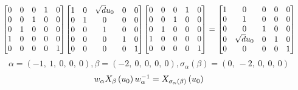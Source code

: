 \documentclass[11pt]{article}
\theoremstyle{definition}
\begin{document}
\[
\scaletoalign{\textwidth}{{\left[\begin{matrix}0 & 0 & 0 & 1 & 0\\0 & 0 & 1 & 0 & 0\\0 & 1 & 0 & 0 & 0\\1 & 0 & 0 & 0 & 0\\0 & 0 & 0 & 0 & 1\end{matrix}\right]} {\left[\begin{matrix}1 & 0 & \sqrt{d} u_{0} & 0 & 0\\0 & 1 & 0 & 0 & 0\\0 & 0 & 1 & 0 & 0\\0 & 0 & 0 & 1 & 0\\0 & 0 & 0 & 0 & 1\end{matrix}\right]} {\left[\begin{matrix}0 & 0 & 0 & 1 & 0\\0 & 0 & 1 & 0 & 0\\0 & 1 & 0 & 0 & 0\\1 & 0 & 0 & 0 & 0\\0 & 0 & 0 & 0 & 1\end{matrix}\right]} = {\left[\begin{matrix}1 & 0 & 0 & 0 & 0\\0 & 1 & 0 & 0 & 0\\0 & 0 & 1 & 0 & 0\\0 & \sqrt{d} u_{0} & 0 & 1 & 0\\0 & 0 & 0 & 0 & 1\end{matrix}\right]}}
\]
\[
\alpha = \left( -1, \  1, \  0, \  0, \  0\right), \beta = \left( -2, \  0, \  0, \  0, \  0\right), \sigma_{\alpha}(\beta) = \left( 0, \  -2, \  0, \  0, \  0\right)
\]
\[
\scaletoalign{\textwidth}{w_{\alpha} X_{\beta}\left(u_{0}\right) w_{\alpha}^{-1} = X_{\sigma_{\alpha}\left(\beta\right)}\left(u_{0}\right)}
\]
\end{document}
